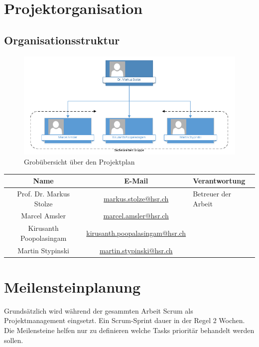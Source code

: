 \newpage

\section{Projektorganisation}
\subsection{Organisationsstruktur}

\begin{figure}[ht]
	\centering
	\includegraphics[width=\textwidth]{images/organigram.png}
	\caption{Grobübersicht über den Projektplan}
	\label{Risk result}
\end{figure}

\begin{tabularx}{\textwidth}{|c|c|X|}
  \hline
  \textbf{Name} & \textbf{E-Mail} & \textbf{Verantwortung} \\
  \hline \hline
  Prof. Dr. Markus Stolze & \url{markus.stolze@hsr.ch} & Betreuer der Arbeit\\
  \hline \hline
  Marcel Amsler & \url{marcel.amsler@hsr.ch} & \\
  \hline
  Kirusanth Poopolasingam & \url{kirusanth.poopalasingam@hsr.ch} & \\
  \hline
  Martin Stypinski & \url{martin.stypinski@hsr.ch} & \\
    \hline
\end{tabularx}

\newpage

\section{Meilensteinplanung}
Grundsätzlich wird während der gesammten Arbeit Scrum als Projektmanagement eingsetzt. Ein Scrum-Sprint dauer in der Regel 2 Wochen. Die Meilensteine helfen nur zu definieren welche Tasks prioritär behandelt werden sollen.

